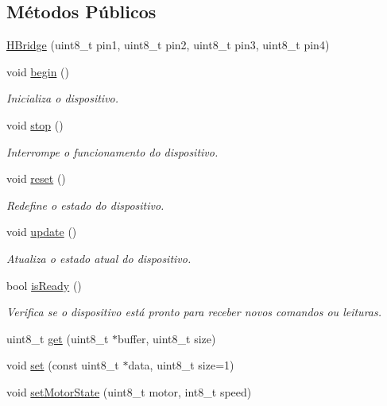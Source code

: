 \subsection*{Métodos Públicos}
\begin{DoxyCompactItemize}
\item 
\hyperlink{classHBridge_a7030e8d12de11cc71ab9945191fafa1c}{H\-Bridge} (uint8\-\_\-t pin1, uint8\-\_\-t pin2, uint8\-\_\-t pin3, uint8\-\_\-t pin4)
\item 
void \hyperlink{classHBridge_ac0bdf510d361688b492206a64d8b2376}{begin} ()
\begin{DoxyCompactList}\small\item\em Inicializa o dispositivo. \end{DoxyCompactList}\item 
void \hyperlink{classHBridge_ad57868053f2f0cc144a8bf80c6090052}{stop} ()
\begin{DoxyCompactList}\small\item\em Interrompe o funcionamento do dispositivo. \end{DoxyCompactList}\item 
void \hyperlink{classHBridge_ad4d86b71b6ece44b30170b439b5e170f}{reset} ()
\begin{DoxyCompactList}\small\item\em Redefine o estado do dispositivo. \end{DoxyCompactList}\item 
void \hyperlink{classHBridge_aa6f6151443b9e6013fc5691504851e58}{update} ()
\begin{DoxyCompactList}\small\item\em Atualiza o estado atual do dispositivo. \end{DoxyCompactList}\item 
bool \hyperlink{classHBridge_a3c43aac5ae38c1f04fdeb148fdfb4820}{is\-Ready} ()
\begin{DoxyCompactList}\small\item\em Verifica se o dispositivo está pronto para receber novos comandos ou leituras. \end{DoxyCompactList}\item 
uint8\-\_\-t \hyperlink{classHBridge_a87391dc065ea5b5dc6693660226cac39}{get} (uint8\-\_\-t $\ast$buffer, uint8\-\_\-t size)
\item 
void \hyperlink{classHBridge_a95099e4fbaf37e9ca13de8f6af9605c9}{set} (const uint8\-\_\-t $\ast$data, uint8\-\_\-t size=1)
\item 
void \hyperlink{classHBridge_a9d7b4166a7455698137031928926aed7}{set\-Motor\-State} (uint8\-\_\-t motor, int8\-\_\-t speed)
\end{DoxyCompactItemize}



